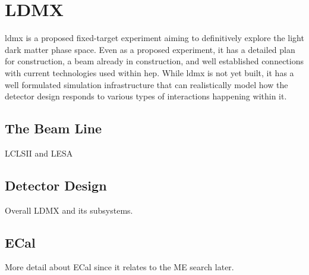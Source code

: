 \chapter{LDMX}
\label{chapter:ldmx:experiment}

\gls{ldmx} is a proposed fixed-target experiment aiming to definitively explore
the light dark matter phase space. Even as a proposed experiment, it has a detailed
plan for construction, a beam already in construction, and well established connections
with current technologies used within \gls{hep}. While \gls{ldmx} is not yet built,
it has a well formulated simulation infrastructure that can realistically model
how the detector design responds to various types of interactions happening within it.

\section{The Beam Line}
LCLSII and LESA

\section{Detector Design}
Overall LDMX and its subsystems.

\section{ECal}
More detail about ECal since it relates to the ME search later.
